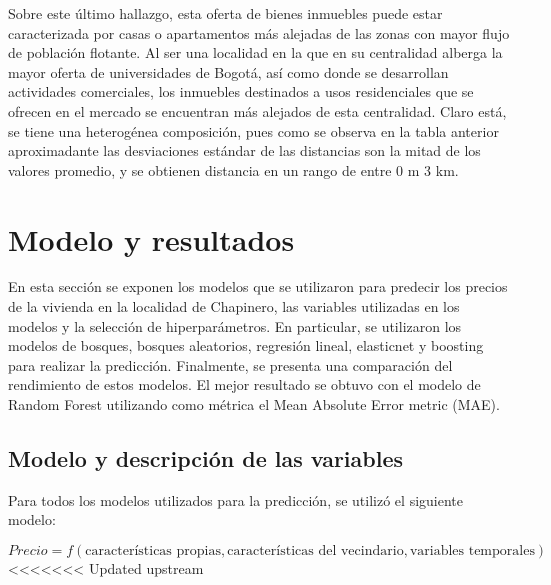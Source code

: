 \documentclass[
  11pt,
  letterpaper,
]{article}
\begin{document}
Sobre este último hallazgo, esta oferta de bienes inmuebles puede estar caracterizada por casas o apartamentos más alejadas de las zonas con mayor flujo de población flotante. Al ser una localidad en la que en su centralidad alberga la mayor oferta de universidades de Bogotá, así como donde se desarrollan actividades comerciales, los inmuebles destinados a usos residenciales que se ofrecen en el mercado se encuentran más alejados de esta centralidad. Claro está, se tiene una heterogénea composición, pues como se observa en la tabla anterior aproximadante las desviaciones estándar de las distancias son la mitad de los valores promedio, y se obtienen distancia en un rango de entre 0 m 3 km.

\hypertarget{modelo-y-resultados}{%
\section{Modelo y resultados}\label{modelo-y-resultados}}

En esta sección se exponen los modelos que se utilizaron para predecir los precios de la vivienda en la localidad de Chapinero, las variables utilizadas en los modelos y la selección de hiperparámetros. En particular, se utilizaron los modelos de bosques, bosques aleatorios, regresión lineal, elasticnet y boosting para realizar la predicción. Finalmente, se presenta una comparación del rendimiento de estos modelos. El mejor resultado se obtuvo con el modelo de Random Forest utilizando como métrica el Mean Absolute Error metric (MAE).

\hypertarget{modelo-y-descripciuxf3n-de-las-variables}{%
\subsection{Modelo y descripción de las variables}\label{modelo-y-descripciuxf3n-de-las-variables}}

Para todos los modelos utilizados para la predicción, se utilizó el siguiente modelo:

\[
Precio= f(\text{características propias}, \text{características del vecindario},\text{variables temporales})
\]
\textless\textless\textless\textless\textless\textless\textless{} Updated upstream
\end{document}
